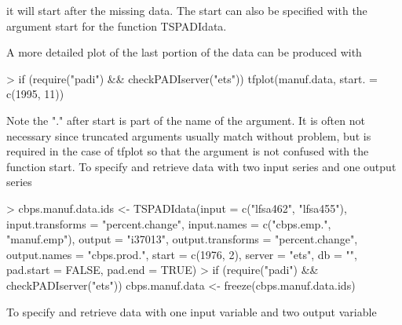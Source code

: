 \documentclass[english]{article}
\begin{document}
it will start after the missing data. The start can also be specified
with the argument start for the function TSPADIdata.


A more detailed plot of the last portion of the data can be produced
with

\begin{Schunk}
\begin{Sinput}
> if (require("padi") && checkPADIserver("ets")) tfplot(manuf.data, 
      start. = c(1995, 11))
\end{Sinput}
\end{Schunk}

Note the "." after start is part of the name of the argument.
It is often not necessary since truncated arguments usually match
without problem, but is required in the case of tfplot so that the
argument is not confused with the function start. To specify and retrieve
data with two input series and one output series

\begin{Schunk}
\begin{Sinput}
> cbps.manuf.data.ids <- TSPADIdata(input = c("lfsa462", "lfsa455"), 
      input.transforms = "percent.change", input.names = c("cbps.emp.", 
          "manuf.emp"), output = "i37013", output.transforms = "percent.change", 
      output.names = "cbps.prod.", start = c(1976, 2), server = "ets", 
      db = "", pad.start = FALSE, pad.end = TRUE)
> if (require("padi") && checkPADIserver("ets")) cbps.manuf.data <- freeze(cbps.manuf.data.ids)
\end{Sinput}
\end{Schunk}

To specify and retrieve data with one input variable and two output
variable
\end{document}
